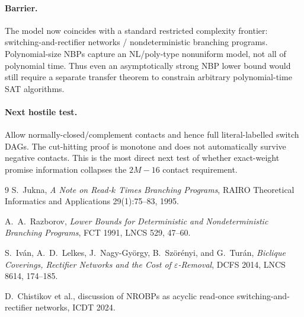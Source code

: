 \paragraph{Barrier.}
The model now coincides with a standard restricted complexity frontier: switching-and-rectifier
networks / nondeterministic branching programs.  Polynomial-size NBPs capture an
NL/poly-type nonuniform model, not all of polynomial time.  Thus even an asymptotically
strong NBP lower bound would still require a separate transfer theorem to constrain arbitrary
polynomial-time SAT algorithms.

\paragraph{Next hostile test.}
Allow normally-closed/complement contacts and hence full literal-labelled switch DAGs.
The cut-hitting proof is monotone and does not automatically survive negative contacts.
This is the most direct next test of whether exact-weight promise information collapses the
$2M-16$ contact requirement.

\begin{thebibliography}{9}
S.~Jukna,
\emph{A Note on Read-$k$ Times Branching Programs},
RAIRO Theoretical Informatics and Applications 29(1):75--83, 1995.

A.~A.~Razborov,
\emph{Lower Bounds for Deterministic and Nondeterministic Branching Programs},
FCT 1991, LNCS 529, 47--60.

S.~Iv\'an, A.~D.~Lelkes, J.~Nagy-Gy\"orgy, B.~Sz\"or\'enyi, and G.~Tur\'an,
\emph{Biclique Coverings, Rectifier Networks and the Cost of $\varepsilon$-Removal},
DCFS 2014, LNCS 8614, 174--185.

D.~Chistikov et al.,
discussion of NROBPs as acyclic read-once switching-and-rectifier networks,
ICDT 2024.
\end{thebibliography}

